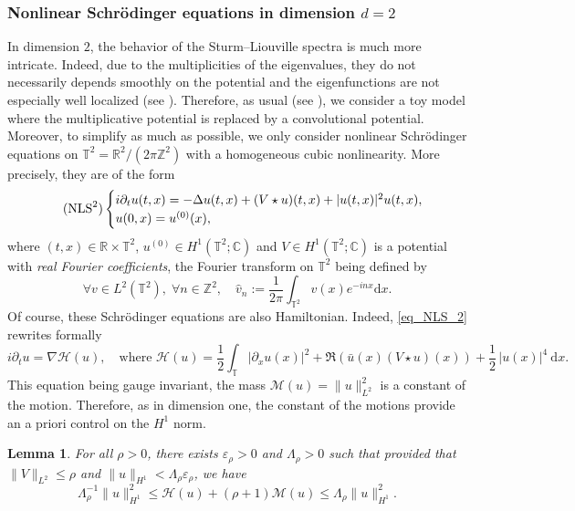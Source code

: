 \documentclass[JEP,XML,SOM,Unicode,NoEqCountersInSection,published]{cedram}
\newtheorem{lemma}[theorem]{Lemma}
\theoremstyle{definition}
\begin{document}
\subsubsection{Nonlinear Schrödinger equations in dimension $d=2$}
\label{sub_sec_NLS2}
In dimension $2$, the behavior of the Sturm--Liouville spectra is much more intricate. Indeed, due to the multiplicities of the eigenvalues, they do not necessarily depends smoothly on the potential and the eigenfunctions are not especially well localized (see \eg \cite{BB13}). Therefore, as usual (see \eg \cite{BG06,FI19,BMP20}), we consider a toy model where the multiplicative potential is replaced by a convolutional potential. Moreover, to simplify as much as possible, we only consider nonlinear Schrödinger equations on $\mathbb{T}^2 = \mathbb{R}^2 / (2\pi \mathbb{Z}^2)$ with a homogeneous cubic nonlinearity. More precisely, they are of the form
\begin{equation}
\label{eq_NLS_2}
\tag{$\mathrm{NLS}^2$}
\begin{cases}
i\partial_t u(t,x) = -\Delta u(t,x) +(V \star u)(t,x) + |u(t,x)|^2 u(t,x), \\
u(0,x) = u^{(0)}(x),
\end{cases}
\end{equation}
where $(t,x)\in \mathbb{R}\times\mathbb{T}^2$, $u^{(0)}\in H^1(\mathbb{T}^2;\mathbb{C})$ and $V \in H^1(\mathbb{T}^2 ; \mathbb{C})$ is a potential with \emph{real Fourier coefficients}, the Fourier transform on $\mathbb{T}^2$ being defined by
\[
\forall v\in L^2(\mathbb{T}^2),\;\forall n \in \mathbb{Z}^2, \quad \widehat{v}_n:= \frac1{2\pi} \int_{\mathbb{T}^2} v(x) e^{-inx}\mathrm{d}x.
\]
Of course, these Schrödinger equations are also Hamiltonian. Indeed, \eqref{eq_NLS_2} rewrites formally
\[
i\partial_t u = \nabla \mathcal{H}(u), \quad \text{where } \mathcal{H}(u) =\frac12 \int_{\mathbb{T}} |\partial_x u(x) |^2 + \Re (\bar{u}(x)(V \star u)(x)) + \frac12\, |u(x)|^4 \ \mathrm{d}x.
\]
This equation being gauge invariant, the mass $\mathcal{M}(u) = \|u\|_{L^2}^2$ is a constant of the motion. Therefore, as in dimension one, the constant of the motions provide an a priori control on the $H^1$ norm.
\begin{lemma} \label{lemma_Lag_NLS_coer_2d} For all $\rho>0$, there exists $\varepsilon_\rho >0$ and $\Lambda_\rho>0$ such that provided that $\| V \|_{L^2} \leq \rho$ and $\|u\|_{H^1} < \Lambda_\rho \varepsilon_\rho$, we have
\[
\Lambda_{\rho}^{-1} \| u\|_{H^1}^2 \leq \mathcal{H}(u) + (\rho+1) \mathcal{M}(u) \leq \Lambda_{\rho} \| u\|_{H^1}^2.
\]
\end{lemma}
\end{document}

